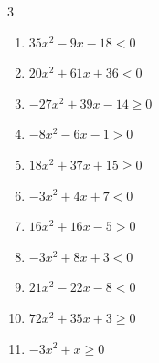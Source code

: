 \begin{multicols}{3}
\begin{enumerate}

  \item $35x^{2}-9x-18<0$


\columnbreak %

  \item $20x^{2}+61x+36<0$


  \item $-27x^{2}+39x-14\geq 0$


  \item $-8x^{2}-6x-1>0$


  \item $18x^{2}+37x+15\geq 0$


  \item $-3x^{2}+4x+7<0$


  \item $16x^{2}+16x-5>0$


  \item $-3x^{2}+8x+3<0$


  \item $21x^{2}-22x-8<0$


  \item $72x^{2}+35x+3\geq 0$


  \item $-3x^{2}+x\geq 0$


\columnbreak %


\end{enumerate}
\end{multicols}
